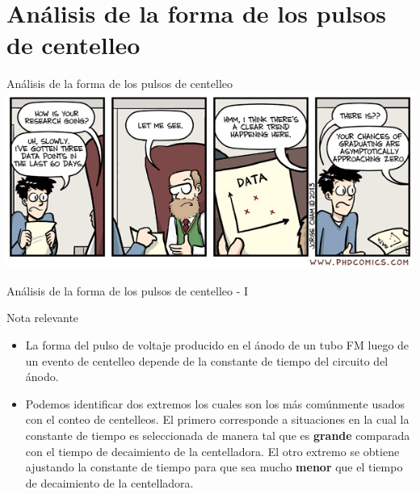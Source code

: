 \documentclass[a4paper,10pt]{beamer}
\begin{document}
\section{Análisis de la forma de los pulsos de centelleo}
\begin{frame}
\begin{center}
 {\Huge{\color{blue}Análisis de la forma de los pulsos de centelleo}} \\
 \vspace{0.5cm}
 \includegraphics[scale=0.5]{fig43}
\end{center}
\end{frame}

\begin{frame}{Análisis de la forma de los pulsos de centelleo - I}
 
 \begin{block}{Nota relevante}
  \begin{itemize}[<+->]
   \item \begin{justify}
          La forma del pulso de voltaje producido en el ánodo de un tubo FM luego de 
          un evento de centelleo depende de la constante de tiempo del circuito del 
          ánodo.
         \end{justify}
  \item \begin{justify}
         Podemos identificar dos extremos los cuales son los más comúnmente usados 
         con el conteo de centelleos. El primero corresponde a situaciones en la 
         cual la constante de tiempo es seleccionada de manera tal que es \textbf{grande} 
         comparada con el tiempo de decaimiento de la centelladora. El otro extremo 
         se obtiene ajustando la constante de tiempo para que sea mucho \textbf{menor} 
         que el tiempo de decaimiento de la centelladora.
        \end{justify}

  \end{itemize}

 \end{block}
\end{frame}
\end{document}

